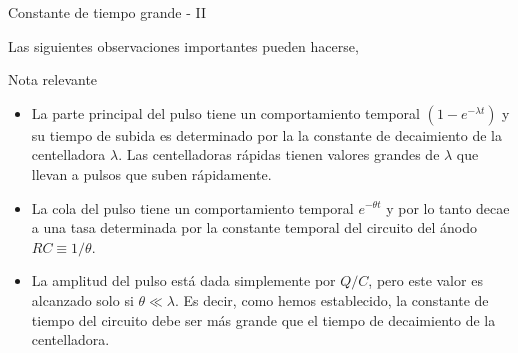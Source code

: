 \documentclass[a4paper,10pt]{beamer}
\begin{document}
\begin{frame}{Constante de tiempo grande - II}
 
 Las siguientes observaciones importantes pueden hacerse,
 
 \begin{block}{Nota relevante}
  \begin{itemize}[<+->]
   \item \begin{justify}
          La parte principal del pulso tiene un comportamiento temporal $(1-e^{-\lambda t})$ 
          y su tiempo de subida es determinado por la la constante de decaimiento de 
	  la centelladora $\lambda$. Las centelladoras rápidas tienen valores grandes 
	  de $\lambda$ que llevan a pulsos que suben rápidamente.
         \end{justify}
   \item \begin{justify}
          La cola del pulso tiene un comportamiento temporal $e^{-\theta t}$ y por 
          lo tanto decae a una tasa determinada por la constante temporal del 
          circuito del ánodo $RC \equiv 1/\theta$.
         \end{justify}
     \item \begin{justify}
          La amplitud del pulso está dada simplemente por $Q/C$, pero este valor 
          es alcanzado solo si $\theta \ll \lambda$. Es decir, como hemos establecido, 
          la constante de tiempo del circuito debe ser más grande que el tiempo de 
          decaimiento de la centelladora.
         \end{justify}      
  \end{itemize}
 \end{block}
\end{frame}
\end{document}
